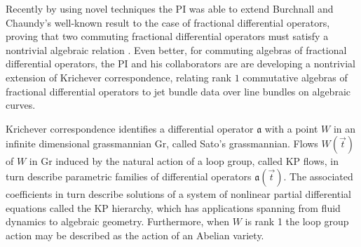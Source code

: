 \documentclass[11pt,letterpaper]{article}
\theoremstyle{definition}
\newcommand{\Gr}{\text{Gr}}
\begin{document}
Recently by using novel techniques the PI was able to extend Burchnall and Chaundy's well-known result \cite{burchnall} to the case of fractional differential operators, proving that two commuting fractional differential operators must satisfy a nontrivial algebraic relation \cite{CHIY}.
Even better, for commuting algebras of fractional differential operators, the PI and his collaborators are are developing a nontrivial extension of Krichever correspondence, relating rank $1$ commutative algebras of fractional differential operators to jet bundle data over line bundles on algebraic curves.

Krichever correspondence identifies a differential operator $\mathfrak a$ with a point $W$ in an infinite dimensional grassmannian $\Gr$, called Sato's grassmannian.
Flows $W(\vec t)$ of $W$ in $\Gr$ induced by the natural action of a loop group, called KP flows, in turn describe parametric families of differential operators $\mathfrak a(\vec t)$.  The associated coefficients in turn describe solutions of a system of nonlinear partial differential equations called the KP hierarchy, which has applications spanning from fluid dynamics to algebraic geometry.
Furthermore, when $W$ is rank 1 the loop group action may be described as the action of an Abelian variety.
\end{document}
